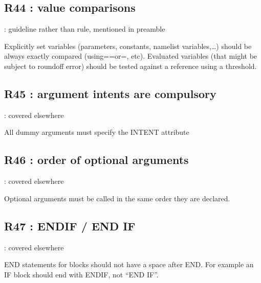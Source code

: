 \documentclass[letterpaper,10pt,english]{sphinxmanual}
\begin{document}
\subsection{R44 : value comparisons}
\label{\detokenize{obsolescent/r44:r44-value-comparisons}}\label{\detokenize{obsolescent/r44::doc}}
\sphinxAtStartPar
{} : guideline rather than rule, mentioned in preamble

\sphinxAtStartPar
Explicitly set variables (parameters, constants, namelist variables,…) should be always exactly
compared (using==or=, etc).
Evaluated variables (that might be subject to roundoff error) should be tested against a reference using a threshold.

\sphinxstepscope


\subsection{R45 : argument intents are compulsory}
\label{\detokenize{obsolescent/r45:r45-argument-intents-are-compulsory}}\label{\detokenize{obsolescent/r45::doc}}
\sphinxAtStartPar
{} : covered elsewhere

\sphinxAtStartPar
All dummy arguments must specify the INTENT attribute

\sphinxstepscope


\subsection{R46 : order of optional arguments}
\label{\detokenize{obsolescent/r46:r46-order-of-optional-arguments}}\label{\detokenize{obsolescent/r46::doc}}
\sphinxAtStartPar
{} : covered elsewhere

\sphinxAtStartPar
Optional arguments must be called in the same order they are declared.

\sphinxstepscope


\subsection{R47 :  ENDIF / END IF}
\label{\detokenize{obsolescent/r47:r47-endif-end-if}}\label{\detokenize{obsolescent/r47::doc}}
\sphinxAtStartPar
{} : covered elsewhere

\sphinxAtStartPar
END statements for blocks should not have a space after END. For example an IF block
should end with ENDIF, not “END IF”.

\sphinxstepscope
\end{document}
